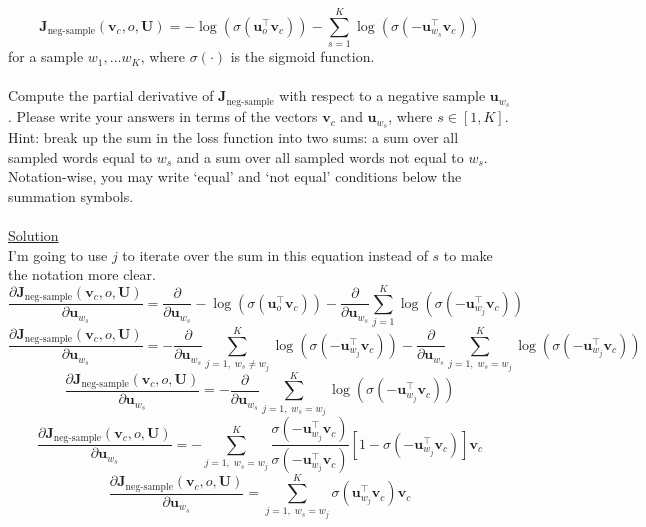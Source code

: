 \documentclass[12pt]{article}
\begin{document}
\begin{equation}
    \bm J_{\text{neg-sample}}(\bm v_c, o, \bm U) = -\log(\sigma(\bm u_o^\top \bm v_c)) - \sum_{s=1}^K \log(\sigma(-\bm u_{w_s}^\top \bm v_c))
    \end{equation}
for a sample $w_1, \ldots w_K$, where $\sigma(\cdot)$ is the sigmoid function.
~\\
~\\
Compute the partial derivative of $\bm J_{\text{neg-sample}}$ with respect to a negative sample $\bm u_{w_s}$. 
Please write your answers in terms of the vectors $\bm v_c$ and $\bm u_{w_s}$, where $s \in [1, K]$. 
Hint: break up the sum in the loss function into two sums: a sum over all sampled words equal to $w_s$ 
and a sum over all sampled words not equal to $w_s$. Notation-wise, you may write `equal' and `not equal' 
conditions below the summation symbols.    
~\\
~\\
\underline{Solution}
~\\
I'm going to use $j$ to iterate over the sum in this equation instead of $s$ to make the 
notation more clear. 
\begin{equation*}
    \frac{\partial \bm J_{\text{neg-sample}}(\bm v_c, o, \bm U)}{\partial \bm u_{w_s}} = 
    \frac{\partial}{\partial \bm u_{w_s}}
    -\log(\sigma(\bm u_o^\top \bm v_c)) - 
    \frac{\partial}{\partial \bm u_{w_s}}
    \sum_{j=1}^K \log(\sigma(-\bm u_{w_j}^\top \bm v_c))
\end{equation*}
\begin{equation*}
    \frac{\partial \bm J_{\text{neg-sample}}(\bm v_c, o, \bm U)}{\partial \bm u_{w_s}} = 
    - \frac{\partial}{\partial \bm u_{w_s}}
    \sum_{j=1, \; w_s \ne w_j}^K \log(\sigma(-\bm u_{w_j}^\top \bm v_c))
    - \frac{\partial}{\partial \bm u_{w_s}}
    \sum_{j=1, \; w_s = w_j}^K \log(\sigma(-\bm u_{w_j}^\top \bm v_c))
\end{equation*}
\begin{equation*}
    \frac{\partial \bm J_{\text{neg-sample}}(\bm v_c, o, \bm U)}{\partial \bm u_{w_s}} = 
    - \frac{\partial}{\partial \bm u_{w_s}}
    \sum_{j=1, \; w_s = w_j}^K \log(\sigma(-\bm u_{w_j}^\top \bm v_c))
\end{equation*}
\begin{equation*}
    \frac{\partial \bm J_{\text{neg-sample}}(\bm v_c, o, \bm U)}{\partial \bm u_{w_s}} = 
    - \sum_{j=1, \; w_s = w_j}^K \frac{\sigma(-\bm u_{w_j}^\top \bm v_c)}{\sigma(-\bm u_{w_j}^\top \bm v_c)}
    [1 - \sigma(-\bm u_{w_j}^\top \bm v_c)] \bm v_c
\end{equation*}
\begin{equation*}
    \frac{\partial \bm J_{\text{neg-sample}}(\bm v_c, o, \bm U)}{\partial \bm u_{w_s}} = 
    \sum_{j=1, \; w_s = w_j}^K 
     \sigma(\bm u_{w_j}^\top \bm v_c) \bm v_c
\end{equation*}
\end{document}
